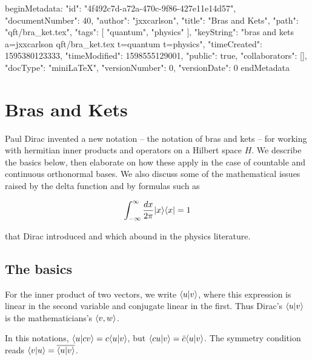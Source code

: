 beginMetadata:
{
    "id": "4f492c7d-a72a-470c-9f86-427e11e14d57",
    "documentNumber": 40,
    "author": "jxxcarlson",
    "title": "Bras and Kets",
    "path": "qft/bra_ket.tex",
    "tags": [
        "quantum",
        "physics"
    ],
    "keyString": "bras and kets a=jxxcarlson qft/bra_ket.tex t=quantum t=physics",
    "timeCreated": 1595380123333,
    "timeModified": 1598555129001,
    "public": true,
    "collaborators": [],
    "docType": "miniLaTeX",
    "versionNumber": 0,
    "versionDate": 0
}
endMetadata
\begin{mathmacro}
\newcommand{\bra}[0]{\langle}
\newcommand{\ket}[0]{\rangle}
\newcommand{\id}[0]{\ Id\ }
\newcommand{\set}[1]{\{#1\}}
\end{mathmacro}

\setcounter{section}{8}

\section{Bras and Kets}


Paul Dirac invented a new notation -- the notation of bras and kets -- for working with hermitian inner products and operators on a Hilbert space $H$.  We describe the basics below, then elaborate on how these apply in the case of countable and continuous orthonormal bases.  We also discuss some of the mathematical issues raised by the delta function and by formulas such as

\begin{equation}
\int_{-\infty}^\infty \frac{dx}{2\pi} | x \ket\bra x | = 1
\end{equation}

that Dirac introduced and which abound in the physics literature.

\subsection{The basics}

For the inner product of two vectors, we write $\bra u | v \ket$, where this expression is linear in the second variable and conjugate linear in the first.  Thus Dirac's $\bra u | v \ket$ is the mathematicians's $\bra v, w \ket$.  

In this notations, $\bra u | c v\ket = c\bra u | v \ket$, but $\bra cu |  v\ket = \bar c\bra u | v \ket$. The symmetry condition reads $\bra v | u \ket = \overline{\langle u  | v \rangle}$.  

